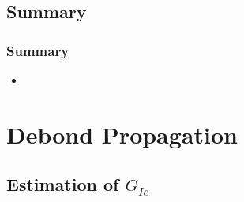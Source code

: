 \documentclass[first,firstsupp,lastsupp,last,hyperref,table]{ETHclass}
\begin{document}
\subsection{Summary}

\begin{frame}
\frametitle{Summary}
\vspace{-0.5cm}
\centering
\begin{itemize}[label=]
\item 
\end{itemize}
\end{frame}

\section{Debond Propagation}

\subsection{Estimation of $G_{Ic}$}
\end{document}
